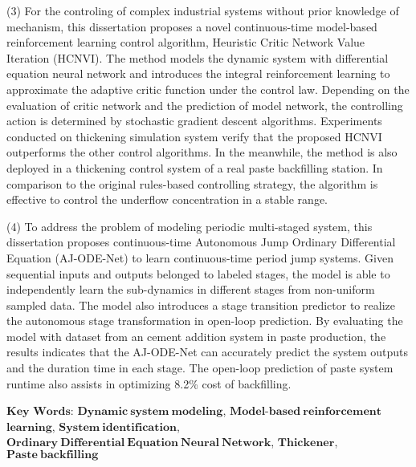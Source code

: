(3) For the controling of complex industrial systems without prior knowledge of mechanism, this dissertation proposes a novel
continuous-time model-based reinforcement learning control algorithm, Heuristic Critic Network Value Iteration (HCNVI).
The method models the dynamic system with differential equation neural network and introduces the integral reinforcement learning to approximate the adaptive critic function under the control law.
Depending on the evaluation of critic network and the prediction of model network, the controlling action is determined by stochastic gradient descent algorithms.
Experiments conducted on thickening simulation system verify that the proposed HCNVI outperforms the other control algorithms.
In the meanwhile, the method is also deployed in a thickening control system of a real paste backfilling station.
In comparison to the original rules-based controlling strategy, the algorithm is effective to control the underflow concentration in a stable range.


(4) To address the problem of modeling periodic multi-staged system, this dissertation proposes continuous-time Autonomous Jump Ordinary Differential Equation (AJ-ODE-Net) to learn continuous-time period jump systems.
Given sequential inputs and outputs belonged to labeled stages,
the model is able to independently learn the sub-dynamics in different stages from non-uniform sampled data. 
The model also introduces a stage transition predictor to realize the autonomous stage transformation in open-loop prediction. 
By evaluating the model with dataset from an cement  addition system in paste production, the results indicates that the AJ-ODE-Net can accurately predict the system outputs and the duration time in each stage.
The open-loop prediction of paste system runtime also assists in optimizing 8.2\% cost of backfilling.


\vskip 30bp
{
    $\mathbf{Key}$ $\mathbf{Words}$: 
    $\mathbf{Dynamic\ system\ modeling}$, 
    $\mathbf{Model}$-$\mathbf{based\ reinforcement}$
    $\mathbf{learning}$,
    $\mathbf{System\ identification}$, 
    $\mathbf{Ordinary\ Differential\ Equation\ Neural\ Network}$,
    $\mathbf{Thickener}$,
    $\mathbf{Paste\ backfilling}$
    
}

